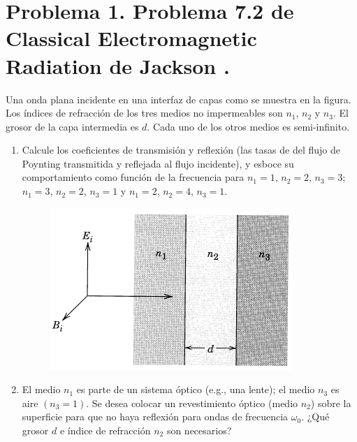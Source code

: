 \documentclass[a4paper,11pt]{article}
\numberwithin{equation}{section}
\renewcommand{\thefootnote}{\fnsymbol{footnote}}
\begin{document}

\fancyhead[R]{\thepage}

\setcounter{footnote}{0}
\renewcommand*{\thefootnote}{\arabic{footnote}}


\section{Problema 1. Problema 7.2 de Classical Electromagnetic Radiation
de Jackson \cite{jackson}.}

Una onda plana incidente en una interfaz de capas como se muestra en la figura. Los 
índices de refracción de los tres medios no impermeables son $n_1$, $n_2$ y $n_3$. 
El grosor de la capa intermedia es $d$. Cada uno de los otros medios es semi-infinito.

\begin{enumerate}[label=\textbf{(\alph*)}]
 \item Calcule los coeficientes de transmisión y reflexión (las tasas de del flujo de 
 Poynting transmitida y reflejada al flujo incidente), y esboce su comportamiento como 
 función de la frecuencia para $n_1 = 1$, $n_2 = 2$, $n_3 = 3$; $n_1 = 3$, $n_2 = 2$, 
 $n_3 = 1$ y $n_1 = 2$, $n_2 = 4$, $n_3 = 1$.

\begin{figure}[H]
 \center 
 \includegraphics[scale=0.7]{problema1fig1}
\end{figure}

\item El medio $n_1$ es parte de un sistema óptico (e.g., una lente); el medio 
$n_3$ es aire $(n_3 = 1)$. Se desea colocar un revestimiento óptico (medio $n_2$) 
sobre la superficie para que no haya reflexión para ondas de frecuencia $\omega_0$. 
¿Qué grosor $d$ e índice de refracción $n_2$ son necesarios?

\end{enumerate}
\end{document}
